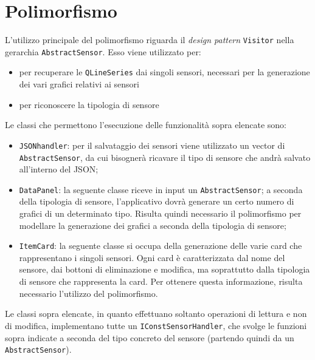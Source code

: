 \documentclass[a4paper, 12pt]{article}
\begin{document}
    \section{Polimorfismo}
    L'utilizzo principale del polimorfismo riguarda il \emph{design pattern} \texttt{Visitor} nella gerarchia \texttt{AbstractSensor}. Esso viene utilizzato per:
    \begin{itemize}
        \item per recuperare le \texttt{QLineSeries} dai singoli sensori, necessari per la generazione dei vari grafici relativi ai sensori
        \item per riconoscere la tipologia di sensore
    \end{itemize}
    Le classi che permettono l'esecuzione delle funzionalità sopra elencate sono:
    \begin{itemize}
        \item \texttt{JSONhandler}: per il salvataggio dei sensori viene utilizzato un vector di\\ \texttt{AbstractSensor}, da cui bisognerà ricavare il tipo di sensore che andrà salvato all'interno del JSON;
        \item \texttt{DataPanel}: la seguente classe riceve in input un \texttt{AbstractSensor}; a seconda della tipologia di sensore, l'applicativo dovrà generare un certo numero di grafici di un determinato tipo. 
        Risulta quindi necessario il polimorfismo per modellare la generazione dei grafici a seconda della tipologia di sensore;
        \item \texttt{ItemCard}: la seguente classe si occupa della generazione delle varie card che rappresentano i singoli sensori. Ogni card è caratterizzata
        dal nome del sensore, dai bottoni di eliminazione e modifica, ma soprattutto dalla tipologia di sensore che rappresenta la card. Per ottenere questa informazione, risulta necessario l'utilizzo del polimorfismo.
    \end{itemize}
    Le classi sopra elencate, in quanto effettuano soltanto operazioni di lettura e non di modifica, implementano tutte un \texttt{IConstSensorHandler}, che svolge le funzioni sopra indicate a seconda del tipo concreto del sensore (partendo quindi da un \texttt{AbstractSensor}).
\end{document}
